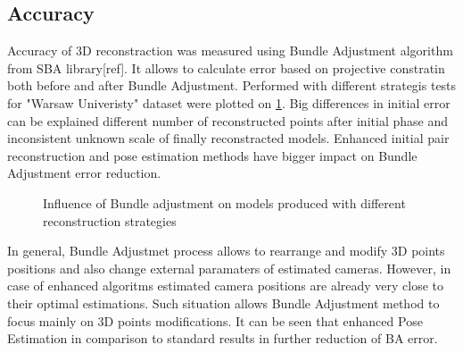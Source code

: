 \subsection{Accuracy}
Accuracy of 3D reconstraction was measured using Bundle Adjustment algorithm from SBA library[ref]. It allows to calculate error based on projective constratin both before and after Bundle Adjustment.
Performed with different strategis tests for "Warsaw Univeristy" dataset were plotted on \ref{plot:BAError}. Big differences in initial error can be explained different number of reconstructed points after initial phase and inconsistent unknown scale of finally reconstracted models. Enhanced initial pair reconstruction and pose estimation methods have bigger impact on Bundle Adjustment error reduction.
\begin{figure}[ht!]
  \begin{center}
    \caption{Influence of Bundle adjustment on models produced with different reconstruction strategies }
    \label{plot:BAError}
  \end{center}
\end{figure}
\clearpage
In general, Bundle Adjustmet process allows to rearrange and modify 3D points positions and also change external paramaters of estimated cameras. However, in case of enhanced algoritms estimated camera positions are already very close to their optimal estimations. Such situation allows Bundle Adjustment method to focus mainly on 3D points modifications. It can be seen that enhanced Pose Estimation in comparison to standard results in further reduction of BA error. 

